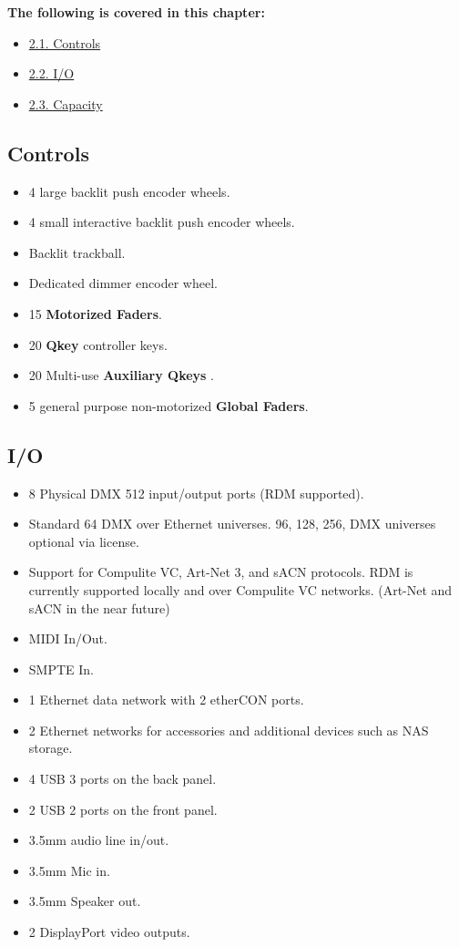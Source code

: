 \documentclass[
]{article}
\providecommand{\tightlist}{%
  \setlength{\itemsep}{0pt}\setlength{\parskip}{0pt}}
\begin{document}
\textbf{The following is covered in this chapter:}

\begin{itemize}
\tightlist
\item
  \href{https://vibemanual.compulite.com/general-specification.html\#controls}{2.1. Controls}
\item
  \href{https://vibemanual.compulite.com/general-specification.html\#io}{2.2. I/O}
\item
  \href{https://vibemanual.compulite.com/general-specification.html\#capacity}{2.3. Capacity}
\end{itemize}

\hypertarget{controls}{%
\subsection{Controls}\label{controls}}

\begin{itemize}
\item
  4 large backlit push encoder wheels.
\item
  4 small interactive backlit push encoder wheels.
\item
  Backlit trackball.
\item
  Dedicated dimmer encoder wheel.
\item
  15 \textbf{Motorized Faders}.
\item
  20 \textbf{Qkey} controller keys.
\item
  20 Multi-use \textbf{Auxiliary Qkeys} .
\item
  5 general purpose non-motorized \textbf{Global Faders}.
\end{itemize}

\hypertarget{io}{%
\subsection{I/O}\label{io}}

\begin{itemize}
\item
  8 Physical DMX 512 input/output ports (RDM supported).
\item
  Standard 64 DMX over Ethernet universes. 96, 128, 256, DMX universes optional via license.
\item
  Support for Compulite VC, Art-Net 3, and sACN protocols. RDM is currently supported locally and over Compulite VC networks. (Art-Net and sACN in the near future)
\item
  MIDI In/Out.
\item
  SMPTE In.
\item
  1 Ethernet data network with 2 etherCON ports.
\item
  2 Ethernet networks for accessories and additional devices such as NAS storage.
\item
  4 USB 3 ports on the back panel.
\item
  2 USB 2 ports on the front panel.
\item
  3.5mm audio line in/out.
\item
  3.5mm Mic in.
\item
  3.5mm Speaker out.
\item
  2 DisplayPort video outputs.
\end{itemize}
\end{document}
